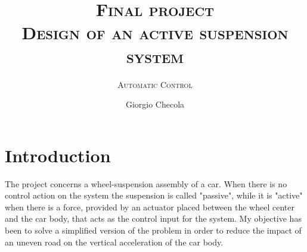 \documentclass[11pt,a4paper]{article}
\title{\textsc{Final project \\ \bigskip Design of an active suspension system}}
\subtitle{\textsc{Automatic Control}}
\author{Giorgio Checola}
\begin{document}
\graphicspath{ {./images/} }
\maketitle
\thispagestyle{empty}
\thispagestyle{empty}
\mbox{}
\newpage


\section{Introduction}	
The project concerns a wheel-suspension assembly of a car. When there is no control action on the system the suspension is called "passive", while it is "active" when there is a force, provided by an actuator placed between the wheel center and the car body, that acts as the control input for the system.
My objective has been to solve a simplified version of the problem in order to reduce the impact of an uneven road on the vertical acceleration of the car body.
\end{document}
